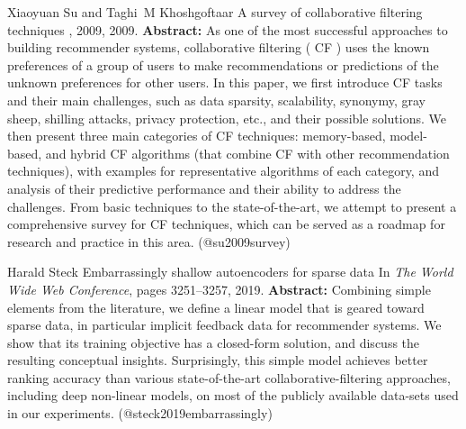 \documentclass{article}
\begin{document}
\begin{thebibliography}{}
 Xiaoyuan Su and Taghi~M Khoshgoftaar \newblock A survey of collaborative filtering techniques , 2009, 2009. \newblock \textbf{Abstract:} As one of the most successful approaches to building recommender systems, collaborative filtering ( CF ) uses the known preferences of a group of users to make recommendations or predictions of the unknown preferences for other users. In this paper, we first introduce CF tasks and their main challenges, such as data sparsity, scalability, synonymy, gray sheep, shilling attacks, privacy protection, etc., and their possible solutions. We then present three main categories of CF techniques: memory-based, model-based, and hybrid CF algorithms (that combine CF with other recommendation techniques), with examples for representative algorithms of each category, and analysis of their predictive performance and their ability to address the challenges. From basic techniques to the state-of-the-art, we attempt to present a comprehensive survey for CF techniques, which can be served as a roadmap for research and practice in this area. \newblock (@su2009survey)

 Harald Steck \newblock Embarrassingly shallow autoencoders for sparse data \newblock In {\em The World Wide Web Conference}, pages 3251--3257, 2019. \newblock \textbf{Abstract:} Combining simple elements from the literature, we define a linear model that is geared toward sparse data, in particular implicit feedback data for recommender systems. We show that its training objective has a closed-form solution, and discuss the resulting conceptual insights. Surprisingly, this simple model achieves better ranking accuracy than various state-of-the-art collaborative-filtering approaches, including deep non-linear models, on most of the publicly available data-sets used in our experiments. \newblock (@steck2019embarrassingly)


\end{thebibliography}
\end{document}
